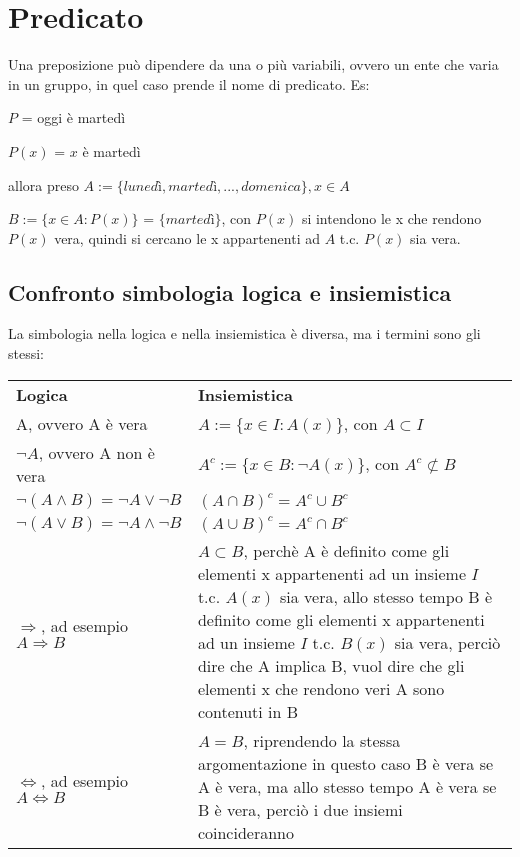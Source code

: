 \documentclass[a4paper,12pt]{article}
\begin{document}
	\section{Predicato}
	Una preposizione può dipendere da una o più variabili, ovvero un ente che varia in un gruppo, in quel caso prende il nome di predicato. 
	Es: 
	
	$P$ = oggi è martedì
	
	$P(x)$ = $x$ è martedì 
	
	allora preso $A := \{lunedì, martedì, ... , domenica\}, x \in A$
	
	$B := \{x\in A : P(x)\}$ = $\{martedì\}$, con $P(x)$ si intendono le x che rendono $P(x)$ vera, quindi si cercano le x appartenenti ad $A$ t.c. $P(x)$ sia vera.
	
	\subsection{Confronto simbologia logica e insiemistica}
	La simbologia nella logica e nella insiemistica è diversa, ma i termini sono gli stessi: \newline
	\begin{center}
		\begin{tabular}{p{} p{}}
			\textbf{Logica} &
			\textbf{Insiemistica} \\
			A, ovvero A è vera &
			$A := \{x \in I : A(x)\}$, con $A \subset I$ \\
			$\neg A$, ovvero A non è vera &
			$A^c := \{x \in B : \neg A(x)\}$, con $A^c \not\subset B$ \\
			$\neg (A \wedge B) = \neg A \vee \neg B$ &
			$(A \cap B)^c = A^c \cup B^c$ \\
			$\neg (A \vee B) = \neg A \wedge \neg B$ &
			$(A \cup B)^c = A^c \cap B^c$ \\
			$\Rightarrow$, ad esempio $A \Rightarrow B$ &
			$A \subset B$, perchè A è definito come gli elementi x appartenenti ad un insieme $I$ t.c. $A(x)$ sia vera, allo stesso tempo B è definito come gli elementi x appartenenti ad un insieme $I$ t.c. $B(x)$ sia vera, perciò dire che A implica B, vuol dire che gli elementi x che rendono veri A sono contenuti in B \\
			$\iff$, ad esempio $A \iff B$ & $A = B$, riprendendo la stessa argomentazione in questo caso B è vera se A è vera, ma allo stesso tempo A è vera se B è vera, perciò i due insiemi coincideranno
		\end{tabular}
	\end{center}
	
\end{document}
